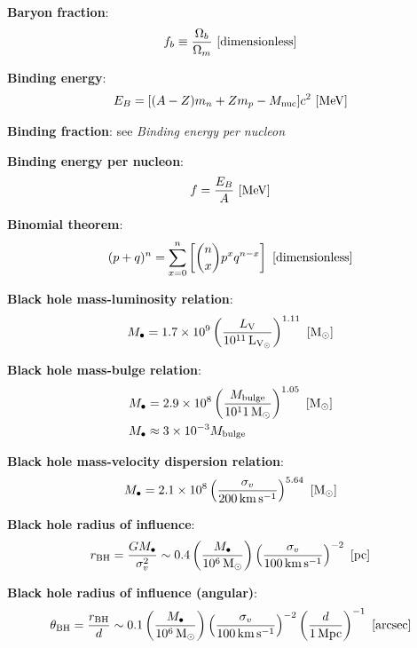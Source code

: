 \documentclass[a4paper,10pt]{article}
\begin{document}
{\noindent}\textbf{Baryon fraction}:
\begin{align*}
    f_b \equiv \frac{\Omega_b}{\Omega_m} ~ [{\rm dimensionless}]
\end{align*}

{\noindent}\textbf{Binding energy}:
\begin{align*}
    E_B = [(A-Z)m_n+Zm_p-M_{\rm nuc}]c^2  ~ [{\rm MeV}]
\end{align*}

{\noindent}\textbf{Binding fraction}: see \textit{Binding energy per nucleon}

{\noindent}\textbf{Binding energy per nucleon}:
\begin{align*}
    f = \frac{E_B}{A} ~ [{\rm MeV}]
\end{align*}

{\noindent}\textbf{Binomial theorem}:
\begin{align*}
    (p+q)^n = \sum _{x=0}^n \left[ \binom{n}{x}p^xq^{n-x} \right] ~ [{\rm dimensionless}]
\end{align*}

{\noindent}\textbf{Black hole mass-luminosity relation}:
\begin{align*}
    M_\bullet = 1.7\times10^9\left(\frac{L_\mathrm{V}}{10^{11}\,{\rm L_{V_\odot}}}\right)^{1.11} ~ [{\rm M_\odot}]
\end{align*}

{\noindent}\textbf{Black hole mass-bulge relation}:
\begin{align*}
    M_\bullet &= 2.9\times10^8\left(\frac{M_\mathrm{bulge}}{10^11\,{\rm M_\odot}}\right)^{1.05} ~ [{\rm M_\odot}] \\
    M_\bullet &\approx 3\times10^{-3}M_\mathrm{bulge}
\end{align*}

{\noindent}\textbf{Black hole mass-velocity dispersion relation}:
\begin{align*}
    M_\bullet = 2.1\times 10^8\left(\frac{\sigma_v}{200\,{\rm km\,s^{-1}}}\right)^{5.64} ~ [{\rm M_\odot}]
\end{align*}

{\noindent}\textbf{Black hole radius of influence}:
\begin{align*}
    r_\mathrm{BH} = \frac{GM_\bullet}{\sigma_v^2} \sim 0.4\left(\frac{M_\bullet}{10^6\,{\rm M_\odot}}\right)\left(\frac{\sigma_v}{100\,{\rm km\,s^{-1}}}\right)^{-2} ~ [{\rm pc}]
\end{align*}

{\noindent}\textbf{Black hole radius of influence (angular)}:
\begin{align*}
    \theta_\mathrm{BH} = \frac{r_\mathrm{BH}}{d} \sim 0.1\left(\frac{M_\bullet}{10^6\,{\rm M_\odot}}\right) \left(\frac{\sigma_v}{100\,{\rm km\,s^{-1}}}\right)^{-2} \left(\frac{d}{1\,{\rm Mpc}}\right)^{-1} ~ [{\rm arcsec}]
\end{align*}
\end{document}
